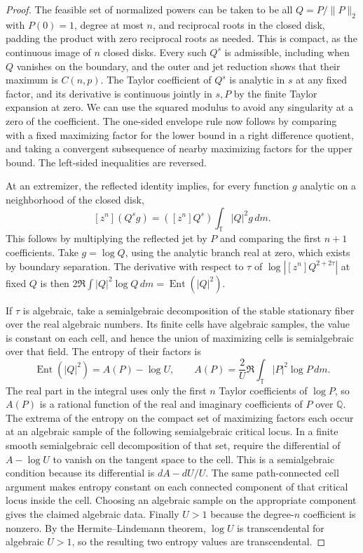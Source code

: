\documentclass[11pt]{article}
\newcommand{\T}{\mathbb T}
\newcommand{\Ent}{\operatorname{Ent}}
\begin{document}
\begin{proof}
The feasible set of normalized powers can be taken to be all
\(Q=P/\|P\|_2\) with \(P(0)=1\), degree at most \(n\), and
reciprocal roots in the closed disk, padding the product with
zero reciprocal roots as needed. This is compact, as the
continuous image of \(n\) closed disks. Every such \(Q^s\)
is admissible, including when \(Q\) vanishes on the boundary,
and the outer and jet reduction shows that their maximum is
\(C(n,p)\). The Taylor coefficient of \(Q^s\) is analytic in
\(s\) at any fixed factor, and its derivative is continuous
jointly in \(s,P\) by the finite Taylor expansion at zero.
We can use the squared modulus to avoid any singularity
at a zero of the coefficient. The one-sided envelope rule
now follows by comparing with a fixed maximizing factor
for the lower bound in a right difference quotient, and
taking a convergent subsequence of nearby maximizing factors
for the upper bound. The left-sided inequalities are reversed.

At an extremizer, the reflected identity implies, for every
function \(g\) analytic on a neighborhood of the closed disk,
\[
 [z^n](Q^s g)=([z^n]Q^s)\int_\T |Q|^2g\,dm .
\]
This follows by multiplying the reflected jet by \(P\) and
comparing the first \(n+1\) coefficients. Take \(g=\log Q\),
using the analytic branch real at zero, which exists by
boundary separation. The derivative with respect to \(\tau\)
of \(\log|[z^n]Q^{2+2\tau}|\) at fixed \(Q\) is then
\(2\Re\int |Q|^2\log Q\,dm=\Ent(|Q|^2)\).

If \(\tau\) is algebraic, take a semialgebraic decomposition
of the stable stationary fiber over the real algebraic numbers.
Its finite cells have algebraic samples, the value is constant
on each cell, and hence the union of maximizing cells is
semialgebraic over that field. The entropy of their factors is
\[
 \Ent(|Q|^2)=A(P)-\log U,\qquad
 A(P)=\frac{2}{U}\Re\int_\T |P|^2\log P\,dm.
\]
The real part in the integral uses only the first \(n\) Taylor
coefficients of \(\log P\), so \(A(P)\) is a rational function
of the real and imaginary coefficients of \(P\) over
\(\mathbb Q\). The extrema of the entropy on the compact set
of maximizing factors each occur at an algebraic sample
of the following semialgebraic critical locus. In a finite
smooth semialgebraic cell decomposition of that set, require
the differential of \(A-\log U\) to vanish on the tangent
space to the cell. This is a semialgebraic condition because
its differential is \(dA-dU/U\). The same path-connected
cell argument makes entropy constant on each connected
component of that critical locus inside the cell. Choosing
an algebraic sample on the appropriate component gives
the claimed algebraic data. Finally \(U>1\) because the
degree-\(n\) coefficient is nonzero. By the
Hermite--Lindemann theorem, \(\log U\) is transcendental
for algebraic \(U>1\), so the resulting two entropy values
are transcendental.
\end{proof}
\end{document}
